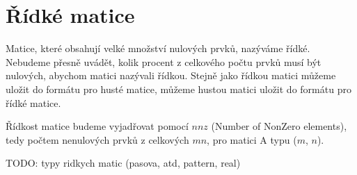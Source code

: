 \section{Řídké matice}

Matice, které obsahují velké množství nulových prvků, nazýváme řídké. Nebudeme přesně uvádět, kolik procent z celkového počtu prvků musí být nulových, abychom matici nazývali řídkou. Stejně jako řídkou matici můžeme uložit do formátu pro husté matice, můžeme hustou matici uložit do formátu pro řídké matice.

Řídkost matice budeme vyjadřovat pomocí $nnz$ (Number of NonZero elements), tedy počtem nenulových prvků z celkových $mn$, pro matici A typu ($m$, $n$).

TODO: typy ridkych matic (pasova, atd, pattern, real)












